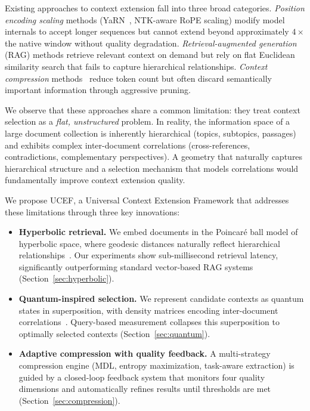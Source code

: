 \documentclass[11pt,a4paper]{article}
\newcommand{\ucef}{\textsf{UCEF}}
\begin{document}
Existing approaches to context extension fall into three broad categories.
\emph{Position encoding scaling} methods (YaRN~\citep{peng2024yarn},
NTK-aware RoPE scaling) modify model internals to accept longer sequences
but cannot extend beyond approximately $4\times$ the native window without
quality degradation.  \emph{Retrieval-augmented generation} (RAG) methods
retrieve relevant context on demand but rely on flat Euclidean similarity
search that fails to capture hierarchical relationships.
\emph{Context compression} methods~\citep{jiang2024longllmlingua,li2026ata}
reduce token count but often discard semantically important information
through aggressive pruning.

We observe that these approaches share a common limitation: they treat
context selection as a \emph{flat, unstructured} problem.  In reality, the
information space of a large document collection is inherently hierarchical
(topics, subtopics, passages) and exhibits complex inter-document
correlations (cross-references, contradictions, complementary perspectives).
A geometry that naturally captures hierarchical structure and a selection
mechanism that models correlations would fundamentally improve context
extension quality.

We propose \ucef{}, a Universal Context Extension Framework that addresses
these limitations through three key innovations:

\begin{itemize}
  \item \textbf{Hyperbolic retrieval.}
    We embed documents in the Poincar\'{e} ball model of hyperbolic space,
    where geodesic distances naturally reflect hierarchical
    relationships~\citep{nickel2017poincare}.  Our experiments show
    sub-millisecond retrieval latency, significantly outperforming standard
    vector-based RAG systems (Section~\ref{sec:hyperbolic}).

  \item \textbf{Quantum-inspired selection.}
    We represent candidate contexts as quantum states in superposition, with
    density matrices encoding inter-document
    correlations~\citep{vanrijsbergen2004,zuccon2009}.  Query-based
    measurement collapses this superposition to optimally selected
    contexts (Section~\ref{sec:quantum}).

  \item \textbf{Adaptive compression with quality feedback.}
    A multi-strategy compression engine (MDL, entropy maximization,
    task-aware extraction) is guided by a closed-loop feedback system that
    monitors four quality dimensions and automatically refines results until
    thresholds are met (Section~\ref{sec:compression}).
\end{itemize}
\end{document}
